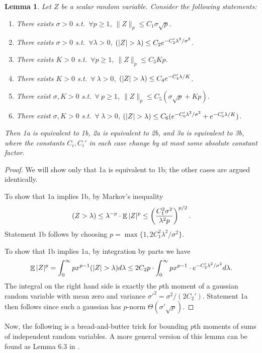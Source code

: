 \documentclass[12pt]{article}
\DeclareMathOperator*{\E}{\mathbb{E}}
\let\Pr\relax
\DeclareMathOperator*{\Pr}{\mathbb{P}}
\newtheorem{lemma}{Lemma}
\newcommand{\LemmaName}[1]{\label{lem:#1}}
\begin{document}
\begin{lemma}\LemmaName{byparts}
Let $Z$ be a scalar random variable. Consider the following statements:
\begin{enumerate}
\item[(1a)] There exists $\sigma>0$ s.t.\ $\forall p\ge 1$, $\|Z\|_p \le C_1 \sigma\sqrt{p}$.
\item[(1b)] There exists $\sigma>0$ s.t.\ $\forall \lambda > 0$, $\Pr(|Z| > \lambda) \le C_2 e^{-C_2'\lambda^2/\sigma^2}$.
\item[(2a)] There exists $K>0$ s.t.\ $\forall p\ge 1$, $\|Z\|_p \le C_3 Kp$.
\item[(2b)] There exists $K>0$ s.t.\ $\forall\ \lambda > 0$, $\Pr(|Z| > \lambda) \le C_4 e^{-C_4'\lambda/K}$.
\item[(3a)] There exist $\sigma, K>0$ s.t.\ $\forall\ p\ge 1$, $\|Z\|_p \le C_5 (\sigma\sqrt{p} + Kp)$.
\item[(3b)] There exist $\sigma, K>0$ s.t.\ $\forall\ \lambda > 0$, $\Pr(|Z| > \lambda) \le C_6 (e^{-C_6'\lambda^2/\sigma^2} + e^{-C_6'\lambda/K})$.
\end{enumerate}
Then 1a is equivalent to 1b, 2a is equivalent to 2b, and 3a is equivalent to 3b, where the constants $C_i, C_i'$ in each case change by at most some absolute constant factor.
\end{lemma}
\begin{proof}
We will show only that 1a is equivalent to 1b; the other cases are argued identically.

To show that 1a implies 1b, by Markov's inequality
$$
\Pr(Z > \lambda) \le \lambda^{-p} \cdot \E|Z|^p \le \left(\frac{C_1^2 \sigma^2}{\lambda^2 p}\right)^{p/2} .
$$
Statement 1b follows by choosing $p = \max\{1, 2C_1^2\lambda^2/\sigma^2\}$.

To show that 1b implies 1a, by integration by parts we have
$$
\E|Z|^p = \int_0^\infty px^{p-1} \Pr(|Z| > \lambda) d\lambda \le 2C_2 p \cdot \int_0^\infty px^{p-1} \cdot e^{-C_2'\lambda^2/\sigma^2} d\lambda.
$$
The integral on the right hand side is exactly the $p$th moment of a gaussian random variable with mean zero and variance $\sigma'^2 = \sigma^2 / (2C_2')$. Statement 1a then follows since such a gaussian has $p$-norm $\Theta(\sigma' \sqrt{p})$.
\end{proof}

Now, the following is a bread-and-butter trick for bounding $p$th moments of sums of independent random variables. A more general version of this lemma can be found as Lemma 6.3 in \cite{LedouxT91}.
\end{document}
